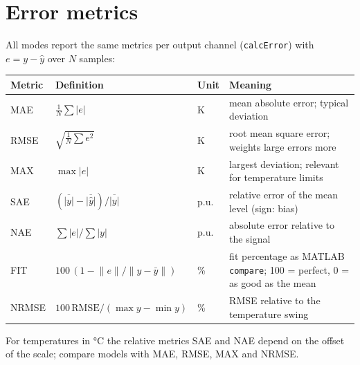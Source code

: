 \documentclass[11pt,a4paper]{article}
\begin{document}
\section{Error metrics}\label{sec:metrics}
All modes report the same metrics per output channel (\texttt{calcError}) with $e=y-\hat y$ over $N$ samples:
\begin{table}[h]\centering\small
\begin{tabularx}{\linewidth}{@{}lllX@{}}\toprule
Metric & Definition & Unit & Meaning \\\midrule
MAE & $\frac1N\sum|e|$ & \si{\kelvin} & mean absolute error; typical deviation \\
RMSE & $\sqrt{\frac1N\sum e^2}$ & \si{\kelvin} & root mean square error; weights large errors more \\
MAX & $\max|e|$ & \si{\kelvin} & largest deviation; relevant for temperature limits \\
SAE & $(\overline{|y|}-\overline{|\hat y|})/\overline{|y|}$ & p.u. & relative error of the mean level (sign: bias) \\
NAE & $\sum|e|/\sum|y|$ & p.u. & absolute error relative to the signal \\
FIT & $100\,(1-\lVert e\rVert/\lVert y-\bar y\rVert)$ & \si{\percent} & fit percentage as MATLAB \texttt{compare}; 100 = perfect, 0 = as good as the mean \\
NRMSE & $100\,\mathrm{RMSE}/(\max y-\min y)$ & \si{\percent} & RMSE relative to the temperature swing \\\bottomrule
\end{tabularx}
\end{table}

For temperatures in \si{\celsius} the relative metrics SAE and NAE depend on the offset of the scale; compare models
with MAE, RMSE, MAX and NRMSE.
\end{document}
